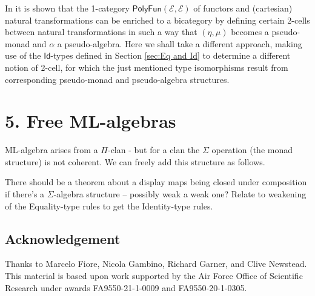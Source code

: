 \documentclass[12pt,reqno]{amsart}
\newcommand{\ednote}[1]{[\textit{\color{red}{#1}}]} %
\newcommand{\EE}{\ensuremath{\mathcal{E}}}
\theoremstyle{remark}
\theoremstyle{definition}
\begin{document}
In \cite{Newstead, Awodey-Newstead} it is shown that the 1-category $\mathsf{PolyFun}(\EE, \EE)$ of functors and (cartesian) natural transformations can be enriched to a bicategory by defining certain 2-cells between natural transformations in such a way that $(\eta, \mu)$ becomes a pseudo-monad and $\alpha$ a pseudo-algebra.  Here we shall take a different approach, making use of the $\mathsf{Id}$-types defined in Section \ref{sec:Eq and Id} to  determine a different notion of 2-cell, for which the just mentioned type isomorphisms result from corresponding pseudo-monad and pseudo-algebra structures.  
 






\section*{5. Free ML-algebras}\label{sec:Free ML-Algebras}

ML-algebra arises from a $\Pi$-clan - but for a clan the $\Sigma$ operation (the monad structure) is not coherent. 
We can freely add this structure as follows.

There should be a theorem about a display maps being closed under composition if there's a $\Sigma$-algebra structure -- possibly weak a weak one?  Relate to weakening of the Equality-type rules to get the Identity-type rules.



 


\subsection*{Acknowledgement}

Thanks to Marcelo Fiore, Nicola Gambino, Richard Garner, and Clive Newstead.  This material is based upon work supported by the Air Force Office of Scientific Research under awards FA9550-21-1-0009 and FA9550-20-1-0305.




\end{document}

